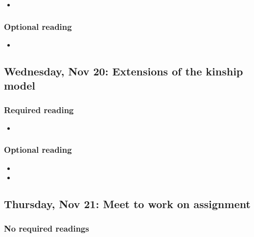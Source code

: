 \documentclass{article}
\begin{document}
\begin{itemize}
    \item {}
\end{itemize}

\subsubsection*{Optional reading}

\begin{itemize}
    \item {}
\end{itemize}


\subsection*{Wednesday, Nov 20: Extensions of the kinship model}

\subsubsection*{Required reading}

\begin{itemize}
   \item {}
\end{itemize}

\subsubsection*{Optional reading}

\begin{itemize}
     \item {}
     \item {}
\end{itemize}

\subsection*{Thursday, Nov 21: Meet to work on assignment}

\subsubsection*{No required readings}
\end{document}
